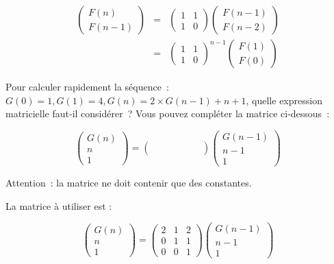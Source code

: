 \documentclass[11pt]{article}
\begin{document}
\begin{eqnarray*}
 \left( \begin{array}{c} F(n) \\
 F(n-1)
\end{array}\right) &=& 
\left( \begin{array}{cc}  1 & 1 \\
1 & 0
\end{array}\right) \left(\begin{array}{c} F(n-1) \\
 F(n-2)\end{array}\right)   \\
&=& \left( \begin{array}{cc}  1 & 1 \\
1 & 0
\end{array}\right)^{n-1} \left(\begin{array}{c} F(1)\\
F(0)\end{array}\right)
\end{eqnarray*}

Pour calculer rapidement la séquence~: $G(0)=1, G(1)=4, G(n)=2\times G(n-1)+n+1$, quelle expression matricielle faut-il considérer~? Vous pouvez compléter la matrice ci-dessous~:

$$
 \left( \begin{array}{c}
G(n) \\
n\\
1\end{array}\right) = \left( \begin{array}{ccc}
\quad & \quad & \quad \\
\quad & \quad & \quad \\
\quad & \quad & \quad \end{array}\right) \left(\begin{array}{c} G(n-1) \\
n-1\\
1\end{array}\right)
$$

Attention~: la matrice ne doit contenir que des constantes.

La matrice à utiliser est :


$$
 \left( \begin{array}{c}
G(n) \\
n\\
1\end{array}\right) = \left( \begin{array}{ccc}
2 & 1 & 2 \\
0 & 1 & 1 \\
0 & 0 & 1 \end{array}\right) \left(\begin{array}{c} G(n-1) \\
n-1\\
1\end{array}\right)
$$
\end{document}
